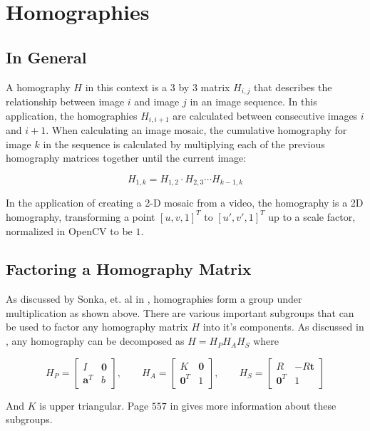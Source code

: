 \documentclass{article}
\begin{document}
\section{Homographies}

\subsection{In General} 

A homography $H$ in this context is a $3$ by $3$ matrix $H_{i, j}$ that
describes the relationship between image $i$ and image $j$ in an image
sequence. In this application, the homographies $H_{i, i + 1}$ are calculated
between consecutive images $i$ and $i + 1$. When calculating an image mosaic,
the cumulative homography for image $k$ in the sequence is calculated by
multiplying each of the previous homography matrices together until the current
image: 

\[H_{1, k} = H_{1, 2} \cdot H_{2, 3} \cdots H_{k - 1, k}\]

In the application of creating a 2-D mosaic from a video, the homography is a
2D homography, transforming a point $[u, v, 1]^T$ to $[u', v', 1]^T$ up to a
scale factor, normalized in OpenCV to be $1$. 

\subsection{Factoring a Homography Matrix}
\label{factoring}

As discussed by Sonka, et. al in \cite{sonkatext}, homographies form a group
under multiplication as shown above. There are various important subgroups that
can be used to factor any homography matrix $H$ into it's components. As
discussed in \cite{sonkatext}, any homography can be decomposed as $H = H_P H_A H_S$ where 

\[
H_P = \begin{bmatrix} I & \mathbf{0} \\ \mathbf{a}^T & b \end{bmatrix}, \qquad
H_A = \begin{bmatrix} K & \mathbf{0} \\ \mathbf{0}^T & 1 \end{bmatrix}, \qquad
H_S = \begin{bmatrix} R & -R\mathbf{t} \\ \mathbf{0}^T & 1 \end{bmatrix}
\] 

And $K$ is upper triangular. Page $557$ in \cite{sonkatext} gives more
information about these subgroups. 
\end{document}
